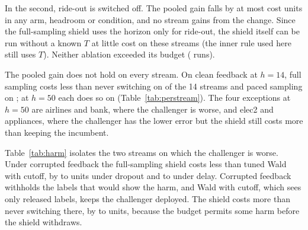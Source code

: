 \documentclass[10pt]{article}
\theoremstyle{plain}
\theoremstyle{definition}
\begin{document}
In the second, ride-out is switched off. The pooled gain falls by at most \AblRideMax{} cost units in any arm, headroom or condition, and no stream gains from the change. Since the full-sampling shield uses the horizon only for ride-out, the shield itself can be run without a known $T$ at little cost on these streams (the inner rule used here still uses $T$). Neither ablation exceeded its budget (\AblRealRuns{} runs).

The pooled gain does not hold on every stream. On clean feedback at $h=14$, full sampling costs less than never switching on \StreamsBetterFull{} of the 14 streams and paced sampling on \StreamsBetterPaced; at $h=50$ each does so on \StreamsBetterFifty{} (Table~\ref{tab:perstream}). The four exceptions at $h=50$ are airlines and bank, where the challenger is worse, and elec2 and appliances, where the challenger has the lower error but the shield still costs more than keeping the incumbent.

\begin{table}[!htbp]
\caption{Two harmful streams (airlines, bank): $\Delta J$ of the full-sampling shield against Wald with cutoff and against never switching, by headroom $h$.}\label{tab:harm}
\centering\scriptsize

\end{table}

Table~\ref{tab:harm} isolates the two streams on which the challenger is worse. Under corrupted feedback the full-sampling shield costs less than tuned Wald with cutoff, by \HarmDropMin{} to \HarmDropMax{} units under dropout and \HarmDelayMin{} to \HarmDelayMax{} under delay. Corrupted feedback withholds the labels that would show the harm, and Wald with cutoff, which sees only released labels, keeps the challenger deployed. The shield costs more than never switching there, by \HarmNeverMin{} to \HarmNeverMax{} units, because the budget permits some harm before the shield withdraws.
\end{document}
